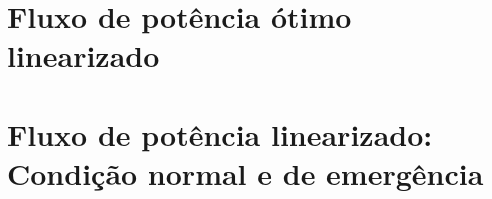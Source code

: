 \documentclass[capchap,sumarioincompleto,a4paper,12pt,ruledheader,normaltoc]{utfprtex}%
\begin{document}
\capa
\newpage
\sumario
\newpage
\newpage


\chapter{Fluxo de potência ótimo linearizado}
	


\chapter{Fluxo de potência linearizado: Condição normal e de emergência}





\end{document}
